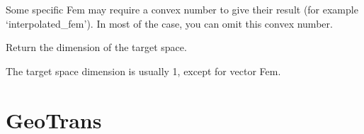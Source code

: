 \documentclass[a4paper,11pt,english]{sphinxmanual}
\begin{document}
\begin{fulllineitems}
\begin{fulllineitems}
Some specific Fem may require a convex number  to give their
result (for example ‘interpolated\_fem’). In most of the case, you
can omit this convex number.

\end{fulllineitems}


\begin{fulllineitems}
\label{\detokenize{python/cmdref_Fem:getfem.Fem.target_dim}}
Return the dimension of the target space.

The target space dimension is usually 1, except for vector Fem.

\end{fulllineitems}


\end{fulllineitems}



\section{GeoTrans}
\label{\detokenize{python/cmdref_GeoTrans:geotrans}}\label{\detokenize{python/cmdref_GeoTrans::doc}}
\end{document}
